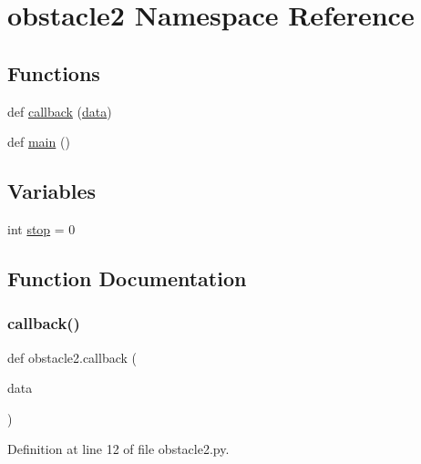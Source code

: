 \hypertarget{namespaceobstacle2}{}\section{obstacle2 Namespace Reference}
\label{namespaceobstacle2}
\subsection*{Functions}
\begin{DoxyCompactItemize}
\item 
def \mbox{\hyperlink{namespaceobstacle2_a370ea80db90ab17982eb80bd9b6509b0}{callback}} (\mbox{\hyperlink{structdata}{data}})
\item 
def \mbox{\hyperlink{namespaceobstacle2_ae70b70b2a3bc31c110b71f1ca8c7eee4}{main}} ()
\end{DoxyCompactItemize}
\subsection*{Variables}
\begin{DoxyCompactItemize}
\item 
int \mbox{\hyperlink{namespaceobstacle2_a2f6f47a409c258af81e2ec3691fda67a}{stop}} = 0
\end{DoxyCompactItemize}


\subsection{Function Documentation}
\mbox{\label{namespaceobstacle2_a370ea80db90ab17982eb80bd9b6509b0}} 
\subsubsection{\texorpdfstring{callback()}{callback()}}
{\footnotesize\ttfamily def obstacle2.\+callback (\begin{DoxyParamCaption}\item[{}]{data }\end{DoxyParamCaption})}



Definition at line 12 of file obstacle2.\+py.

\mbox{\label{namespaceobstacle2_ae70b70b2a3bc31c110b71f1ca8c7eee4}} 
